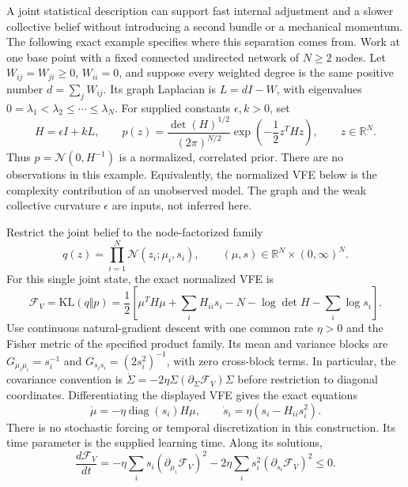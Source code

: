 A joint statistical description can support fast internal adjustment and a slower collective belief without introducing a second bundle or a mechanical momentum. The following exact example specifies where this separation comes from. Work at one base point with a fixed connected undirected network of $N\geq2$ nodes. Let $W_{ij}=W_{ji}\geq0$, $W_{ii}=0$, and suppose every weighted degree is the same positive number $d=\sum_jW_{ij}$. Its graph Laplacian is $L=dI-W$, with eigenvalues $0=\lambda_1<\lambda_2\leq\cdots\leq\lambda_N$. For supplied constants $\epsilon,k>0$, set
\begin{equation}
 H=\epsilon I+kL,\qquad
 p(z)=\frac{\det(H)^{1/2}}{(2\pi)^{N/2}}
       \exp\left(-\frac12z^THz\right),\qquad z\in\mathbb R^N.
 \label{eq:collective_memory_target}
\end{equation}
Thus $p=\mathcal N(0,H^{-1})$ is a normalized, correlated prior. There are no observations in this example. Equivalently, the normalized VFE below is the complexity contribution of an unobserved model. The graph and the weak collective curvature $\epsilon$ are inputs, not inferred here.

Restrict the joint belief to the node-factorized family
\begin{equation}
 q(z)=\prod_{i=1}^N\mathcal N(z_i;\mu_i,s_i),\qquad
 (\mu,s)\in\mathbb R^N\times(0,\infty)^N.
 \label{eq:collective_memory_family}
\end{equation}
For this single joint state, the exact normalized VFE is
\begin{equation}
 \mathcal F_V=\mathrm{KL}(q\Vert p)
 =\frac12\left[
   \mu^TH\mu+\sum_iH_{ii}s_i-N
   -\log\det H-\sum_i\log s_i
 \right].
 \label{eq:collective_memory_vfe}
\end{equation}
Use continuous natural-gradient descent with one common rate $\eta>0$ and the Fisher metric of the specified product family. Its mean and variance blocks are $G_{\mu_i\mu_i}=s_i^{-1}$ and $G_{s_is_i}=(2s_i^2)^{-1}$, with zero cross-block terms. In particular, the covariance convention is $\dot\Sigma=-2\eta\Sigma(\partial_\Sigma\mathcal F_V)\Sigma$ before restriction to diagonal coordinates. Differentiating the displayed VFE gives the exact equations
\begin{equation}
 \dot\mu=-\eta\operatorname{diag}(s_i)H\mu,\qquad
 \dot s_i=\eta(s_i-H_{ii}s_i^2).
 \label{eq:collective_memory_flow}
\end{equation}
There is no stochastic forcing or temporal discretization in this construction. Its time parameter is the supplied learning time. Along its solutions,
\begin{equation}
 \frac{d\mathcal F_V}{dt}
 =-\eta\sum_i s_i(\partial_{\mu_i}\mathcal F_V)^2
   -2\eta\sum_i s_i^2(\partial_{s_i}\mathcal F_V)^2\leq0.
 \label{eq:collective_memory_dissipation}
\end{equation}

